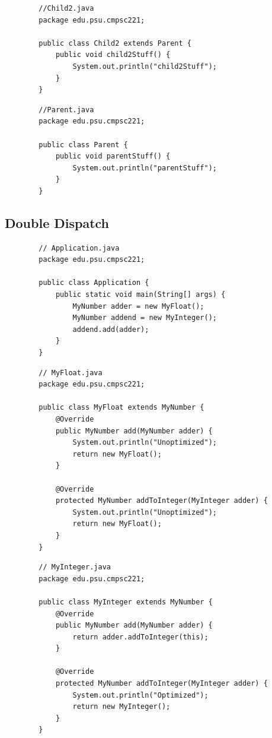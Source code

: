 \documentclass[a4paper, 11pt]{article}
\begin{document}
        \begin{lstlisting}
        //Child2.java
        package edu.psu.cmpsc221;

        public class Child2 extends Parent {
            public void child2Stuff() {
                System.out.println("child2Stuff");
            }
        }
        \end{lstlisting}

        \begin{lstlisting}
        //Parent.java
        package edu.psu.cmpsc221;

        public class Parent {
            public void parentStuff() {
                System.out.println("parentStuff");
            }
        }
        \end{lstlisting}

    \newpage

    \subsection{Double Dispatch}
        \begin{lstlisting}
        // Application.java
        package edu.psu.cmpsc221;

        public class Application {
            public static void main(String[] args) {
                MyNumber adder = new MyFloat();
                MyNumber addend = new MyInteger();
                addend.add(adder);
            }
        }
        \end{lstlisting}

        \begin{lstlisting}
        // MyFloat.java
        package edu.psu.cmpsc221;

        public class MyFloat extends MyNumber {
            @Override
            public MyNumber add(MyNumber adder) {
                System.out.println("Unoptimized");
                return new MyFloat();
            }

            @Override
            protected MyNumber addToInteger(MyInteger adder) {
                System.out.println("Unoptimized");
                return new MyFloat();
            }
        }
        \end{lstlisting}

        \begin{lstlisting}
        // MyInteger.java
        package edu.psu.cmpsc221;

        public class MyInteger extends MyNumber {
            @Override
            public MyNumber add(MyNumber adder) {
                return adder.addToInteger(this);
            }

            @Override
            protected MyNumber addToInteger(MyInteger adder) {
                System.out.println("Optimized");
                return new MyInteger();
            }
        }
        \end{lstlisting}
\end{document}
